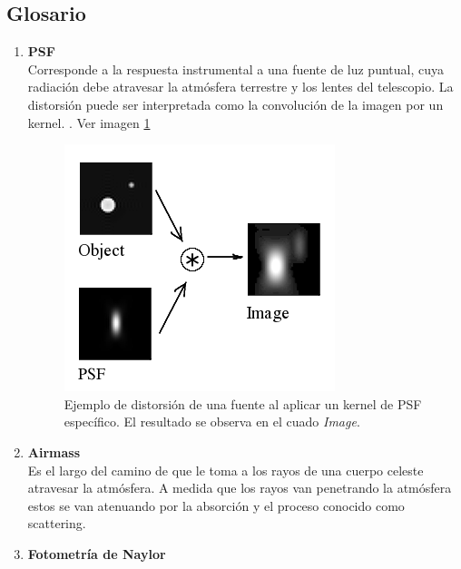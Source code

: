 
\begin{appendix} 
\section{Glosario}

\begin{enumerate}
\item{\textbf{PSF}}\\
\label{a1:psf}
Corresponde a la respuesta instrumental a una fuente de luz puntual, cuya radiaci\'on debe atravesar la atm\'osfera terrestre y los lentes del telescopio. La distorsi\'on puede ser interpretada como la convoluci\'on de la imagen por un kernel. \cite{huentelemu}. Ver imagen \ref{fig:a1}

\begin{figure}[h]
\centering
\includegraphics[scale=.5]{images/psf}
\caption{Ejemplo de distorsi\'on de una fuente al aplicar un kernel de PSF espec\'ifico. El resultado se observa en el cuado \textit{Image}.}
\label{fig:a1}
\end{figure}

\item{\textbf{Airmass}}\label{ap:airmass}\\
Es el largo del camino de que le toma a los rayos de una cuerpo celeste atravesar la atm\'osfera. A medida que los rayos van penetrando la atm\'osfera estos se van atenuando por la absorci\'on y el proceso conocido como scattering. 
\item{\textbf{Fotometr\'ia de Naylor}}\\
\end{enumerate}

\end{appendix}
